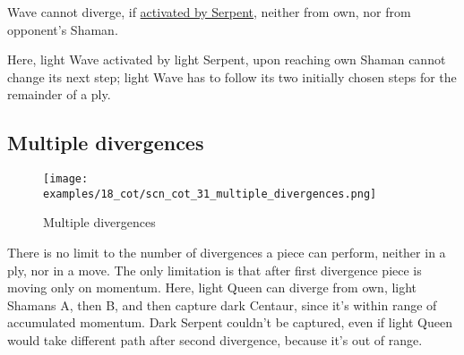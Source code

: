 \vspace*{-0.5\baselineskip}
Wave cannot diverge, if
\hyperref[fig:scn_tr_21_serpent_activating_wave]{activated by Serpent},
neither from own, nor from opponent's Shaman.

Here, light Wave activated by light Serpent, upon reaching own Shaman cannot change
its next step; light Wave has to follow its two initially chosen steps for the
remainder of a ply.

%
%

\clearpage %

\subsection*{Multiple divergences}
\label{sec:Conquest of Tlalocan/Divergence/Multiple divergences}

\vspace*{-1.4\baselineskip}
\noindent
\begin{figure}[!h]
\texttt{[image: examples/18\_cot/scn\_cot\_31\_multiple\_divergences.png]}
\vspace*{-1.3\baselineskip}
\caption{Multiple divergences}
\label{fig:scn_cot_31_multiple_divergences}
\end{figure}

\vspace*{-0.5\baselineskip}
There is no limit to the number of divergences a piece can perform, neither in a ply,
nor in a move. The only limitation is that after first divergence piece is moving
only on momentum. \newline
\indent
Here, light Queen can diverge from own, light Shamans A, then B, and then capture
dark Centaur, since it's within range of accumulated momentum. Dark Serpent couldn't
be captured, even if light Queen would take different path after second divergence,
because it's out of range.

\clearpage %

